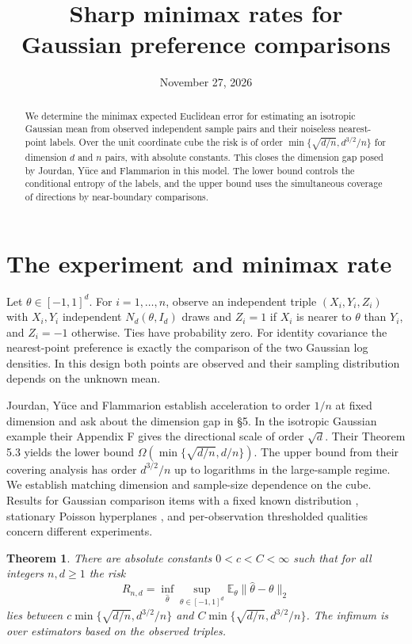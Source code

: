 \documentclass[11pt,a4paper]{amsart}
\title[Minimax rates for Gaussian preference comparisons]{Sharp minimax rates for\texorpdfstring{\\}{ }Gaussian preference comparisons}
\date{November 27, 2026}
\newtheorem{theorem}{Theorem}
\begin{document}
\begin{abstract}
We determine the minimax expected Euclidean error for estimating an isotropic Gaussian mean from observed independent sample pairs and their noiseless nearest-point labels. Over the unit coordinate cube the risk is of order \(\min\{\sqrt{d/n},d^{3/2}/n\}\) for dimension \(d\) and \(n\) pairs, with absolute constants. This closes the dimension gap posed by Jourdan, Y\"uce and Flammarion in this model. The lower bound controls the conditional entropy of the labels, and the upper bound uses the simultaneous coverage of directions by near-boundary comparisons.
\end{abstract}
\maketitle

\section{The experiment and minimax rate}

Let \(\theta\in[-1,1]^d\). For \(i=1,\ldots,n\), observe an independent triple \((X_i,Y_i,Z_i)\) with \(X_i,Y_i\) independent \(N_d(\theta,I_d)\) draws and \(Z_i=1\) if \(X_i\) is nearer to \(\theta\) than \(Y_i\), and \(Z_i=-1\) otherwise. Ties have probability zero. For identity covariance the nearest-point preference is exactly the comparison of the two Gaussian log densities. In this design both points are observed and their sampling distribution depends on the unknown mean.

Jourdan, Y\"uce and Flammarion \cite{jyf} establish acceleration to order \(1/n\) at fixed dimension and ask about the dimension gap in \S5. In the isotropic Gaussian example their Appendix F gives the directional scale of order \(\sqrt d\). Their Theorem 5.3 yields the lower bound \(\Omega(\min\{\sqrt{d/n},d/n\})\). The upper bound from their covering analysis has order \(d^{3/2}/n\) up to logarithms in the large-sample regime. We establish matching dimension and sample-size dependence on the cube. Results for Gaussian comparison items with a fixed known distribution \cite{md}, stationary Poisson hyperplanes \cite{bo}, and per-observation thresholded qualities \cite{jf} concern different experiments.

\begin{theorem}\label{thm:rate}
There are absolute constants \(0<c<C<\infty\) such that for all integers \(n,d\ge1\) the risk
\[
 R_{n,d}=\inf_{\widehat\theta}\sup_{\theta\in[-1,1]^d}
             \mathbb E_\theta\|\widehat\theta-\theta\|_2
\]
lies between \(c\min\{\sqrt{d/n},d^{3/2}/n\}\) and \(C\min\{\sqrt{d/n},d^{3/2}/n\}\). The infimum is over estimators based on the observed triples.
\end{theorem}
\end{document}
